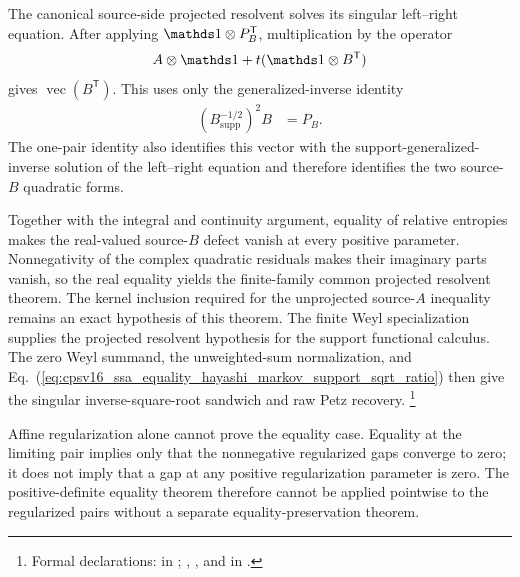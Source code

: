\documentclass[11pt]{article}
\begin{document}
The canonical source-side projected resolvent solves its singular left--right
equation. After applying $\Id\otimes P_B^{\mathsf T}$, multiplication by the
operator
\begin{align}
    A\otimes\Id+t(\Id\otimes B^{\mathsf T})
    \label{eq:cpsv16_ssa_equality_hayashi_markov_singular_left_right_operator}
\end{align}
gives $\operatorname{vec}(B^{\mathsf T})$. This uses only the
generalized-inverse identity
\begin{align}
    \left(B^{-1/2}_{\mathrm{supp}}\right)^2B
        &=P_B.
    \label{eq:cpsv16_ssa_equality_hayashi_markov_generalized_inverse_identity}
\end{align}
The one-pair identity also identifies this vector with the
support-generalized-inverse solution of the left--right equation and therefore
identifies the two source-$B$ quadratic forms.

Together with the integral and continuity argument, equality of relative
entropies makes the real-valued source-$B$ defect vanish at every positive
parameter. Nonnegativity of the complex quadratic residuals makes their
imaginary parts vanish, so the real equality yields the finite-family common
projected resolvent theorem. The kernel inclusion required for the unprojected
source-$A$ inequality remains an exact hypothesis of this theorem. The finite
Weyl specialization supplies the projected resolvent hypothesis for the
support functional calculus. The zero Weyl summand, the unweighted-sum
normalization, and
Eq.~(\ref{eq:cpsv16_ssa_equality_hayashi_markov_support_sqrt_ratio}) then give
the singular inverse-square-root sandwich and raw Petz recovery.%
\footnote{Formal declarations:
 in
;
,
, and
 in
.}

Affine regularization alone cannot prove the equality case. Equality at the
limiting pair implies only that the nonnegative regularized gaps converge to
zero; it does not imply that a gap at any positive regularization parameter is
zero. The positive-definite equality theorem therefore cannot be applied
pointwise to the regularized pairs without a separate equality-preservation
theorem.
\end{document}

